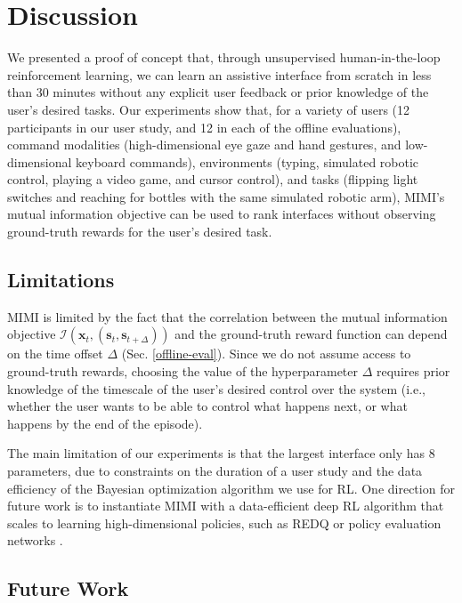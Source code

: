 \documentclass{article}
\newcommand{\bx}{\mathbf{x}}
\newcommand{\bs}{\mathbf{s}}
\newcommand{\mi}{\mathcal{I}}
\begin{document}
\section{Discussion}

We presented a proof of concept that, through unsupervised human-in-the-loop reinforcement learning, we can learn an assistive interface from scratch in less than 30 minutes without any explicit user feedback or prior knowledge of the user's desired tasks.
Our experiments show that, for a variety of users (12 participants in our user study, and 12 in each of the offline evaluations), command modalities (high-dimensional eye gaze and hand gestures, and low-dimensional keyboard commands), environments (typing, simulated robotic control, playing a video game, and cursor control), and tasks (flipping light switches and reaching for bottles with the same simulated robotic arm), MIMI's mutual information objective can be used to rank interfaces without observing ground-truth rewards for the user's desired task.

\subsection{Limitations}

MIMI is limited by the fact that the correlation between the mutual information objective $\mi(\bx_t, (\bs_t, \bs_{t+\Delta}))$ and the ground-truth reward function can depend on the time offset $\Delta$ (Sec. \ref{offline-eval}).
Since we do not assume access to ground-truth rewards, choosing the value of the hyperparameter $\Delta$ requires prior knowledge of the timescale of the user's desired control over the system (i.e., whether the user wants to be able to control what happens next, or what happens by the end of the episode).

The main limitation of our experiments is that the largest interface only has 8 parameters, due to constraints on the duration of a user study and the data efficiency of the Bayesian optimization algorithm we use for RL.
One direction for future work is to instantiate MIMI with a data-efficient deep RL algorithm that scales to learning high-dimensional policies, such as REDQ \cite{chen2021randomized} or policy evaluation networks \cite{harb2020policy}.

\subsection{Future Work}
\end{document}
